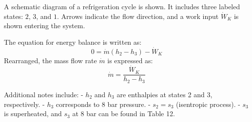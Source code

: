 A schematic diagram of a refrigeration cycle is shown. It includes three labeled states: \( 2 \), \( 3 \), and \( 1 \). Arrows indicate the flow direction, and a work input \( \dot{W}_K \) is shown entering the system.  

The equation for energy balance is written as:  
\[
0 = \dot{m} (h_2 - h_3) - \dot{W}_K
\]  
Rearranged, the mass flow rate \( \dot{m} \) is expressed as:  
\[
\dot{m} = \frac{\dot{W}_K}{h_2 - h_3}
\]  

Additional notes include:  
- \( h_2 \) and \( h_3 \) are enthalpies at states 2 and 3, respectively.  
- \( h_3 \) corresponds to 8 bar pressure.  
- \( s_2 = s_3 \) (isentropic process).  
- \( s_3 \) is superheated, and \( s_3 \) at 8 bar can be found in Table 12.